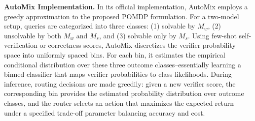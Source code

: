 \documentclass{article}
\theoremstyle{plain}
\theoremstyle{definition}
\theoremstyle{remark}
\begin{document}
\textbf{AutoMix Implementation.} 
In its official implementation, AutoMix employs a greedy approximation to the proposed POMDP formulation. For a two-model setup, queries are categorized into three classes: (1) solvable by $M_w$, (2) unsolvable by both $M_w$ and $M_s$, and (3) solvable only by $M_s$. Using few-shot self-verification or correctness scores, AutoMix discretizes the verifier probability space into uniformly spaced bins. For each bin, it estimates the empirical conditional distribution over these three outcome classes--essentially learning a binned classifier that maps verifier probabilities to class likelihoods. During inference, routing decisions are made greedily: given a new verifier score, the corresponding bin provides the estimated probability distribution over outcome classes, and the router selects an action that maximizes the expected return under a specified trade-off parameter balancing accuracy and cost. 




\end{document}
